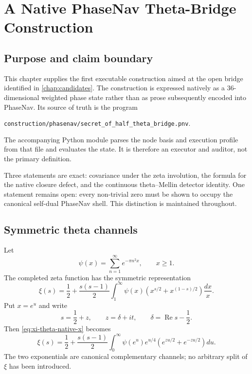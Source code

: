 \chapter{A Native PhaseNav Theta-Bridge Construction}
\label{chap:phasenav-native}

\section{Purpose and claim boundary}

This chapter supplies the first executable construction aimed at the open bridge
identified in \cref{chap:candidates}.  The construction is expressed natively as
a $36$-dimensional weighted phase state rather than as prose subsequently encoded
into PhaseNav.  Its source of truth is the program
\begin{center}
\texttt{construction/phasenav/secret\_of\_half\_theta\_bridge.pnv}.
\end{center}
The accompanying Python module parses the node basis and execution profile from
that file and evaluates the state.  It is therefore an executor and auditor, not
the primary definition.

Three statements are exact: covariance under the zeta involution, the formula for
the native closure defect, and the continuous theta--Mellin detector identity.
One statement remains open: every non-trivial zero must be shown to occupy the
canonical self-dual PhaseNav shell.  This distinction is maintained throughout.

\section{Symmetric theta channels}

Let
\begin{equation}
 \psi(x)=\sum_{n=1}^{\infty}e^{-\pi n^2x},\qquad x\ge1.
 \label{eq:theta-tail-native}
\end{equation}
The completed zeta function has the symmetric representation
\begin{equation}
 \xi(s)=\frac12+\frac{s(s-1)}2\int_1^\infty
 \psi(x)\left(x^{s/2}+x^{(1-s)/2}\right)\frac{dx}{x}.
 \label{eq:xi-theta-native-x}
\end{equation}
Put $x=e^u$ and write
\begin{equation}
 s=\frac12+z,\qquad z=\delta+it,
 \qquad \delta=\operatorname{Re}s-\frac12.
 \label{eq:centered-z-native}
\end{equation}
Then \cref{eq:xi-theta-native-x} becomes
\begin{equation}
 \xi(s)=\frac12+\frac{s(s-1)}2\int_0^\infty
 \psi(e^u)e^{u/4}
 \left(e^{zu/2}+e^{-zu/2}\right)du.
 \label{eq:xi-theta-native-u}
\end{equation}
The two exponentials are canonical complementary channels; no arbitrary split of
$\xi$ has been introduced.

